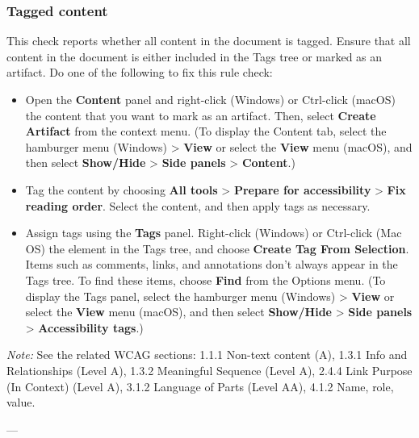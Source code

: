 \subsubsection*{Tagged content}
This check reports whether all content in the document is tagged. Ensure that all content in the document is either included in the Tags tree or marked as an artifact\footnotemark[1].
Do one of the following to fix this rule check:
\begin{itemize}
    \item Open the \textbf{Content} panel and right-click (Windows) or Ctrl-click (macOS) the content that you want to mark as an artifact. Then, select \textbf{Create Artifact} from the context menu. (To display the Content tab, select the hamburger menu (Windows) > \textbf{View} or select the \textbf{View} menu (macOS), and then select \textbf{Show/Hide} > \textbf{Side panels} > \textbf{Content}.)
    \item Tag the content by choosing \textbf{All tools} > \textbf{Prepare for accessibility} > \textbf{Fix reading order}. Select the content, and then apply tags as necessary.
    \item Assign tags using the \textbf{Tags} panel. Right-click (Windows) or Ctrl-click (Mac OS) the element in the Tags tree, and choose \textbf{Create Tag From Selection}. Items such as comments, links, and annotations don't always appear in the Tags tree. To find these items, choose \textbf{Find} from the Options menu. (To display the Tags panel, select the hamburger menu (Windows) > \textbf{View} or select the \textbf{View} menu (macOS), and then select \textbf{Show/Hide} > \textbf{Side panels} > \textbf{Accessibility tags}.)
\end{itemize}

\vspace{0.5em}
\noindent\textit{Note:} See the related WCAG sections: 1.1.1 Non-text content (A), 1.3.1 Info and Relationships (Level A), 1.3.2 Meaningful Sequence (Level A), 2.4.4 Link Purpose (In Context) (Level A), 3.1.2 Language of Parts (Level AA), 4.1.2 Name, role, value\footnotemark[1].

---

